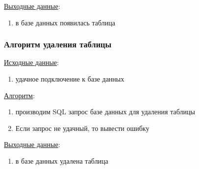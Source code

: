 \underline{Выходные данные}:
\begin{enumerate}
    \item в базе данных появилась таблица
\end{enumerate}


\subsubsection*{Алгоритм удаления таблицы}

\underline{Исходные данные}:
\begin{enumerate}
    \item удачное подключение к базе данных
\end{enumerate}

\underline{Алгоритм}:
\begin{enumerate}
    \item производим SQL запрос базе данных для удаления таблицы
    \item Если запрос не удачный, то вывести ошибку
\end{enumerate}

\underline{Выходные данные}:
\begin{enumerate}
    \item в базе данных удалена таблица
\end{enumerate}

\newpage